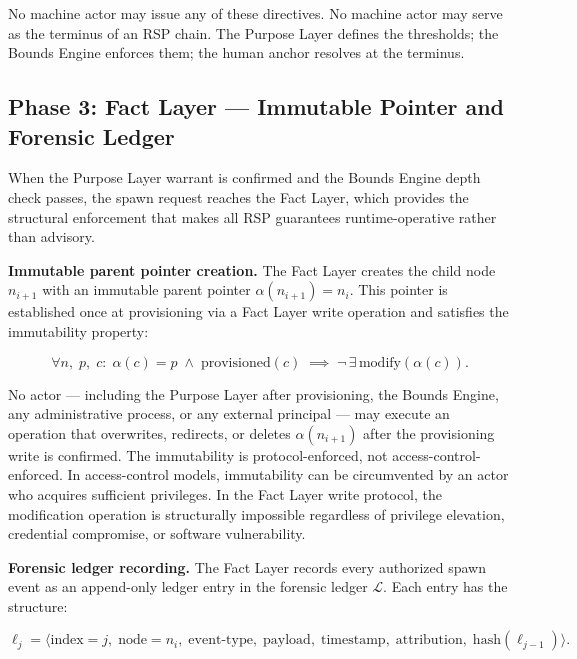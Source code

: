 No machine actor may issue any of these directives. No machine actor may serve as the terminus of an RSP chain. The Purpose Layer defines the thresholds; the Bounds Engine enforces them; the human anchor resolves at the terminus.

\subsection{Phase 3: Fact Layer — Immutable Pointer and Forensic Ledger}

When the Purpose Layer warrant is confirmed and the Bounds Engine depth check passes, the spawn request reaches the Fact Layer, which provides the structural enforcement that makes all RSP guarantees runtime-operative rather than advisory.

\medskip
\noindent\textbf{Immutable parent pointer creation.} The Fact Layer creates the child node $n_{i+1}$ with an immutable parent pointer $\alpha(n_{i+1}) = n_i$. This pointer is established once at provisioning via a Fact Layer write operation and satisfies the immutability property:

\begin{equation}
\forall n,\; p,\; c:\;
\alpha(c) = p \;\land\; \text{provisioned}(c)
\;\implies\;
\neg\,\exists\,\text{modify}(\alpha(c)).
\label{eq:pointer-immutability}
\end{equation}

No actor — including the Purpose Layer after provisioning, the Bounds Engine, any administrative process, or any external principal — may execute an operation that overwrites, redirects, or deletes $\alpha(n_{i+1})$ after the provisioning write is confirmed. The immutability is protocol-enforced, not access-control-enforced. In access-control models, immutability can be circumvented by an actor who acquires sufficient privileges. In the Fact Layer write protocol, the modification operation is structurally impossible regardless of privilege elevation, credential compromise, or software vulnerability.

\medskip
\noindent\textbf{Forensic ledger recording.} The Fact Layer records every authorized spawn event as an append-only ledger entry in the forensic ledger $\mathcal{L}$. Each entry has the structure:

\begin{equation}
\ell_j = \bigl\langle
\text{index}=j,\;
\text{node}=n_i,\;
\text{event-type},\;
\text{payload},\;
\text{timestamp},\;
\text{attribution},\;
\text{hash}(\ell_{j-1})
\bigr\rangle .
\label{eq:ledger-entry}
\end{equation}

